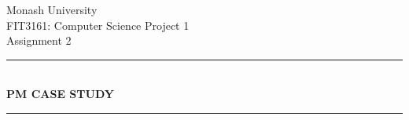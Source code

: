 \begin{titlepage} %
	\newcommand{\HRule}{\rule{\linewidth}{0.5mm}} %
	
	\center %
	
	
	\LARGE Monash University\\[1.5cm] %
	
	\Large FIT3161: Computer Science Project 1\\[0.5cm] %
	
	\large Assignment 2\\[0.5cm] %
	
	
	\HRule\\[0.4cm]
	
	{\huge\bfseries PM CASE STUDY}\\[0.4cm] %
	
	\HRule\\[1.5cm]
	
	
	

\end{titlepage}
